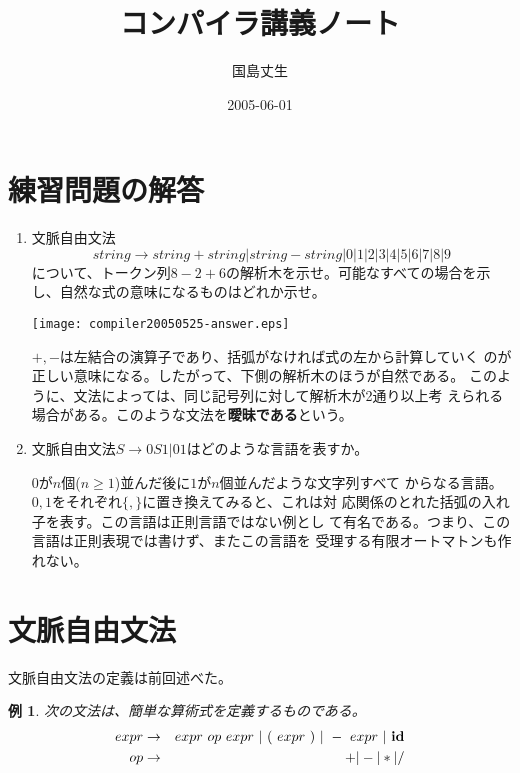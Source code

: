 \documentclass[a4j,11pt]{jsarticle}
\title{コンパイラ講義ノート}
\author{国島丈生}
\date{2005-06-01}
\newtheorem{example}{例}
\begin{document}
\maketitle
\section*{練習問題の解答}
\begin{enumerate}
 \item 文脈自由文法
       \[
	string \rightarrow string + string | string - string | 0 | 1 | 2
       | 3 | 4 | 5 | 6 | 7 | 8 | 9
       \]
       について、トークン列$8-2+6$の解析木を示せ。可能なすべての場合を示
       し、自然な式の意味になるものはどれか示せ。

       \begin{center}
	\texttt{[image: compiler20050525-answer.eps]}
       \end{center}

       $+, -$は左結合の演算子であり、括弧がなければ式の左から計算していく
       のが正しい意味になる。したがって、下側の解析木のほうが自然である。
       このように、文法によっては、同じ記号列に対して解析木が2通り以上考
       えられる場合がある。このような文法を{\bfseries 曖昧である}という。
 \item 文脈自由文法$S \rightarrow 0 S 1 | 0 1$はどのような言語を表すか。

       $0$が$n$個($n \geq 1$)並んだ後に$1$が$n$個並んだような文字列すべて
       からなる言語。$0, 1$をそれぞれ$\{, \}$に置き換えてみると、これは対
       応関係のとれた括弧の入れ子を表す。この言語は正則言語ではない例とし
       て有名である。つまり、この言語は正則表現では書けず、またこの言語を
       受理する有限オートマトンも作れない。
\end{enumerate}

\section{文脈自由文法}
文脈自由文法の定義は前回述べた。

\begin{screen}
 \begin{example}
 次の文法は、簡単な算術式を定義するものである。
 \begin{eqnarray*}
  expr & \rightarrow & expr\ op\ expr\ |\ (\ expr\ )\ |\ -\ expr\ |\
   {\bf id} \\
  op & \rightarrow & + | - | * | / 
 \end{eqnarray*}
 \end{example}
\end{screen}
\end{document}
